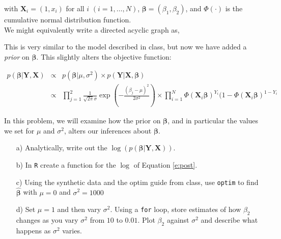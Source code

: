 \documentclass[12pt,letterpaper]{article}
\begin{document}
with $\boldsymbol{X}_{i} = (1, x_{i})$ for all $i$ $(i = 1, \hdots, N)$,  $\boldsymbol{\beta} = (\beta_{1}, \beta_{2})$, and $\Phi(\cdot)$ is the cumulative normal distribution function.  \\

We might equivalently write a directed acyclic graph as, 

\vspace{0.25in}

\begin{large}
\end{large}


This is very similar to the model described in class, but now we have added a \emph{prior} on $\boldsymbol{\beta}$.  This slightly alters the objective function:

\begin{eqnarray}
p(\boldsymbol{\beta} | \boldsymbol{Y}, \boldsymbol{X}) & \propto & p(\boldsymbol{\beta}|\mu, \sigma^2) \times p(\boldsymbol{Y}| \boldsymbol{X}, \boldsymbol{\beta}) \label{e:post} \\
& \propto &  \prod_{j=1}^{2} \frac{1}{\sqrt{2\pi} \sigma} \exp\left( - \frac{(\beta_{j} - \mu)^2}{2 \sigma^2} \right) \times \prod_{i=1}^{N} \Phi(\boldsymbol{X}_{i}\boldsymbol{\beta})^{Y_{i} } ( 1- \Phi(\boldsymbol{X}_{i}\boldsymbol{\beta})^{1 - Y_{i} } \nonumber 
\end{eqnarray}

In this problem, we will examine how the prior on $\boldsymbol{\beta}$, and in particular the values we set for $\mu$ and $\sigma^2$, alters our inferences about $\boldsymbol{\beta}$.

\begin{itemize}
\item[a)] Analytically, write out the $\log(p(\boldsymbol{\beta} | \boldsymbol{Y}, \boldsymbol{X}))$.  
\item[b)] In {\tt R} create a function for the $\log$ of Equation \ref{e:post}.
\item[c)] Using the synthetic data and the optim guide from class, use {\tt optim} to find $\widehat{\boldsymbol{\beta}}$ with $\mu = 0$ and $\sigma^2 = 1000$
\item[d)] Set $\mu = 1$ and then vary $\sigma^2$.  Using a {\tt for} loop, store estimates of how $\beta_{2}$ changes as you vary $\sigma^2$ from $10$ to $0.01$.  Plot $\beta_{2}$ against $\sigma^2$ and describe what happens as $\sigma^2$ varies.  
\end{itemize}
\end{document}
